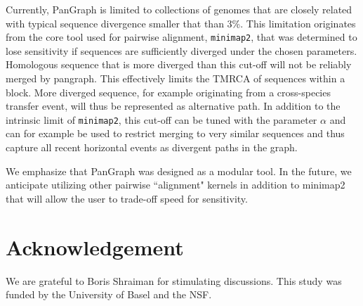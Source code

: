 \documentclass[aps,rmp,reprint,superscriptaddress,notitlepage,10pt]{revtex4-1}
\begin{document}
Currently, PanGraph is limited to collections of genomes that are closely related with typical sequence divergence smaller that than 3\%. 
This limitation originates from the core tool used for pairwise alignment, \texttt{minimap2}, that was determined to lose sensitivity if sequences are sufficiently diverged under the chosen parameters.
Homologous sequence that is more diverged than this cut-off will not be reliably merged by pangraph.
This effectively limits the TMRCA of sequences within a block. 
More diverged sequence, for example originating from a cross-species transfer event, will thus be represented as alternative path.
In addition to the intrinsic limit of \texttt{minimap2}, this cut-off can be tuned with the parameter $\alpha$ and can for example be used to restrict merging to very similar sequences and thus capture all recent horizontal events as divergent paths in the graph.

We emphasize that PanGraph was designed as a modular tool.
In the future, we anticipate utilizing other pairwise ``alignment" kernels in addition to minimap2 that will allow the user to trade-off speed for sensitivity.

\section*{Acknowledgement}
We are grateful to Boris Shraiman for stimulating discussions.
This study was funded by the University of Basel and the NSF.

{}
\end{document}
